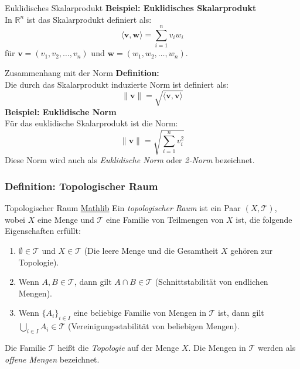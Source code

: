 \documentclass{beamer}
\begin{document}
  \begin{frame}{Euklidisches Skalarprodukt}
      \textbf{Beispiel: Euklidisches Skalarprodukt} \\
      In \( \mathbb{R}^n \) ist das Skalarprodukt definiert als:
      \[
      \langle \mathbf{v}, \mathbf{w} \rangle = \sum_{i=1}^n v_i w_i
      \]
      für \( \mathbf{v} = (v_1, v_2, \dots, v_n) \) und \( \mathbf{w} = (w_1, w_2, \dots, w_n) \).
  \end{frame}
  
  \begin{frame}{Zusammenhang mit der Norm}
      \textbf{Definition:} \\
      Die durch das Skalarprodukt induzierte Norm ist definiert als:
      \[
      \|\mathbf{v}\| = \sqrt{\langle \mathbf{v}, \mathbf{v} \rangle}
      \]
      \textbf{Beispiel: Euklidische Norm} \\
      Für das euklidische Skalarprodukt ist die Norm:
      \[
      \|\mathbf{v}\| = \sqrt{\sum_{i=1}^n v_i^2}
      \]
      Diese Norm wird auch als \textit{Euklidische Norm} oder \textit{2-Norm} bezeichnet.
  \end{frame}
  


  \begin{frame}
    
    \frametitle{Definition: Topologischer Raum }
    \begin{block}{Topologischer Raum \href{https://github.com/leanprover-community/mathlib4/blob/418a5eb7aec3fb639097cb13f74fc031ac4057f2/Mathlib/Topology/Defs/Basic.lean\#L61-L71}{Mathlib}}
    Ein \emph{topologischer Raum} ist ein Paar $(X, \mathcal{T})$, wobei $X$ eine Menge und $\mathcal{T}$ eine Familie von Teilmengen von $X$ ist, die folgende Eigenschaften erfüllt:
    \begin{enumerate}
        \item $\emptyset \in \mathcal{T}$ und $X \in \mathcal{T}$ (Die leere Menge und die Gesamtheit $X$ gehören zur Topologie).
        \item Wenn $A, B \in \mathcal{T}$, dann gilt $A \cap B \in \mathcal{T}$ (Schnittstabilität von endlichen Mengen).
        \item Wenn $\{A_i\}_{i \in I}$ eine beliebige Familie von Mengen in $\mathcal{T}$ ist, dann gilt $\bigcup_{i \in I} A_i \in \mathcal{T}$ (Vereinigungsstabilität von beliebigen Mengen).
    \end{enumerate}
    Die Familie $\mathcal{T}$ heißt die \emph{Topologie} auf der Menge $X$. Die Mengen in $\mathcal{T}$ werden als \emph{offene Mengen} bezeichnet.
\end{block}           
  \end{frame}
\end{document}
